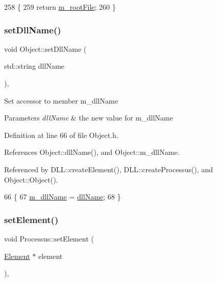 \begin{DoxyCode}
258                      \{
259     \textcolor{keywordflow}{return} \hyperlink{classProcessus_a76114f8cf2111e910c323a7ae05a015d}{m\_rootFile};
260   \}
\end{DoxyCode}
\mbox{\label{classObject_a870c5af919958c2136623b2d7816d123}} 
\subsubsection{\texorpdfstring{set\+Dll\+Name()}{setDllName()}}
{\footnotesize\ttfamily void Object\+::set\+Dll\+Name (\begin{DoxyParamCaption}\item[{std\+::string}]{dll\+Name }\end{DoxyParamCaption})\hspace{0.3cm}{\ttfamily [inline]}, {\ttfamily [inherited]}}

Set accessor to member m\+\_\+dll\+Name 
\begin{DoxyParams}{Parameters}
{\em dll\+Name} & the new value for m\+\_\+dll\+Name \\
\hline
\end{DoxyParams}


Definition at line 66 of file Object.\+h.



References Object\+::dll\+Name(), and Object\+::m\+\_\+dll\+Name.



Referenced by D\+L\+L\+::create\+Element(), D\+L\+L\+::create\+Processus(), and Object\+::\+Object().


\begin{DoxyCode}
66                                       \{
67     \hyperlink{classObject_a01afbeacebb8db6831559972ec362eb3}{m\_dllName} = \hyperlink{classObject_a2e3947f2870094c332d7454117f3ec63}{dllName};
68   \}
\end{DoxyCode}
\mbox{\label{classProcessus_a8ddef94227d83d9dae2cd49aebc33353}} 
\subsubsection{\texorpdfstring{set\+Element()}{setElement()}}
{\footnotesize\ttfamily void Processus\+::set\+Element (\begin{DoxyParamCaption}\item[{\hyperlink{classElement}{Element} $\ast$}]{element }\end{DoxyParamCaption})\hspace{0.3cm}{\ttfamily [inline]}, {\ttfamily [inherited]}}

